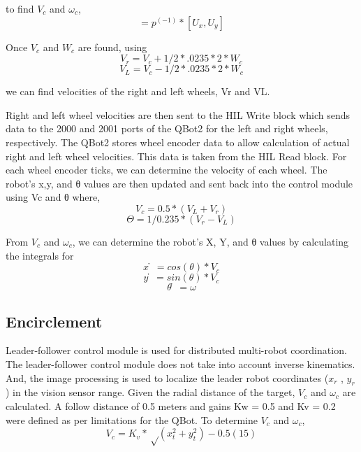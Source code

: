 to find $V_c$ and $ω_c$,
\begin{equation}
[V_c,ω_c ]=p^(-1)*[U_x,U_y]
\end{equation}	

Once $V_c$ and $W_c$ are found, using
\begin{equation}
V_r=V_c+1/2* .0235*2*W_c
\end{equation}
\begin{equation}
	V_L=V_c-1/2* .0235*2*W_c
\end{equation}
	

	
we can find velocities of the right and left wheels, Vr and VL.

Right and left wheel velocities are then sent to the HIL Write block which sends data to the 2000 and 2001 ports of the QBot2 for the left and right wheels, respectively.
The QBot2 stores wheel encoder data to allow calculation of actual right and left wheel velocities. This data is taken from the HIL Read block. For each wheel encoder ticks, we can determine the velocity of each wheel. The robot’s x,y, and θ values are then updated and sent back into the control module using Vc and θ where,
\begin{equation}
V_c=0.5*(V_L+V_r)
\end{equation}
\begin{equation}
Θ=1/0.235*(V_r-V_L)
\end{equation}
	

	


From $V_c$ and $ω_c$, we can determine the robot’s X, Y, and θ values by calculating the integrals for
\begin{equation}
x ̇=cos⁡(θ)*V_c
\end{equation}
\begin{equation}
y ̇=sin⁡(θ)*V_c
\end{equation}
\begin{equation}
	θ̇=ω	
\end{equation}

	

		

\subsection{Encirclement}
Leader-follower control module is used for distributed multi-robot coordination. The leader-follower control module does not take into account inverse kinematics. And, the image processing is used to localize the leader robot coordinates ($𝑥_𝑟$  , $𝑦_𝑟$) in the vision sensor range. Given the radial distance of the target, $V_c$ and $ω_c$ are calculated. A follow distance of 0.5 meters and gains  Kw = 0.5 and Kv = 0.2 were defined as per limitations for the QBot.
To determine $V_c$ and $ω_c$,
\begin{equation}
	V_c=K_v*√(x_t^2+y_t^2 )-0.5	(15)
\end{equation}


